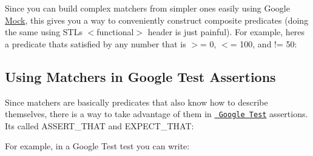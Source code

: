 \begin{DoxyCode}{0}
\DoxyCodeLine{}
\end{DoxyCode}


Since you can build complex matchers from simpler ones easily using Google \mbox{\hyperlink{class_mock}{Mock}}, this gives you a way to conveniently construct composite predicates (doing the same using S\+TL\textquotesingle{}s {\ttfamily $<$functional$>$} header is just painful). For example, here\textquotesingle{}s a predicate that\textquotesingle{}s satisfied by any number that is $>$= 0, $<$= 100, and != 50\+:


\begin{DoxyCode}{0}
\end{DoxyCode}


\subsection*{Using Matchers in Google Test Assertions}

Since matchers are basically predicates that also know how to describe themselves, there is a way to take advantage of them in \href{../../googletest/}{\texttt{ Google Test}} assertions. It\textquotesingle{}s called {\ttfamily A\+S\+S\+E\+R\+T\+\_\+\+T\+H\+AT} and {\ttfamily E\+X\+P\+E\+C\+T\+\_\+\+T\+H\+AT}\+:


\begin{DoxyCode}{0}
\end{DoxyCode}


For example, in a Google Test test you can write\+:


\begin{DoxyCode}{0}
\DoxyCodeLine{}
\DoxyCodeLine{}
\end{DoxyCode}


